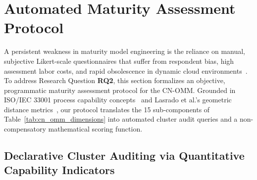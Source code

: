 \section{Automated Maturity Assessment Protocol}
\label{sec:assessment}

A persistent weakness in maturity model engineering is the reliance on manual, subjective Likert-scale questionnaires that suffer from respondent bias, high assessment labor costs, and rapid obsolescence in dynamic cloud environments~\cite{proenca_2016, proenca_2016_rcis}. To address Research Question \textbf{RQ2}, this section formalizes an objective, programmatic maturity assessment protocol for the CN-OMM. Grounded in ISO/IEC 33001 process capability concepts~\cite{iso_33001} and Lasrado et al.'s geometric distance metrics~\cite{lasrado_2015}, our protocol translates the 15 sub-components of Table~\ref{tab:cn_omm_dimensions} into automated cluster audit queries and a non-compensatory mathematical scoring function.

\subsection{Declarative Cluster Auditing via Quantitative Capability Indicators}
\label{subsec:declarative_qci}

